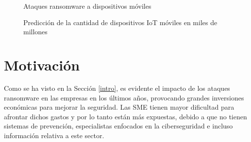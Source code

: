 \begin{figure}[htb]
\begin{center}
{}
\end{center}
\caption{Ataques ransomware a dispositivos móviles}
\label{fig:im1-es}
\end{figure}


\begin{figure}[htb]
\begin{center}
{}
\end{center}
\caption{Predicción de la cantidad de dispositivos IoT móviles en miles de millones}
\label{fig:im2-es}
\end{figure}


\section{Motivación}
\noindent Como se ha visto en la Sección \ref{intro}, es evidente el impacto de los ataques ransomware en las empresas en los últimos años, provocando grandes inversiones económicas para mejorar la seguridad.
Las \gls{SME} tienen mayor dificultad para afrontar dichos gastos y por lo tanto están más expuestas, debido a que no tienen sistemas de prevención, especialistas enfocados en la ciberseguridad e incluso información relativa a este sector.

